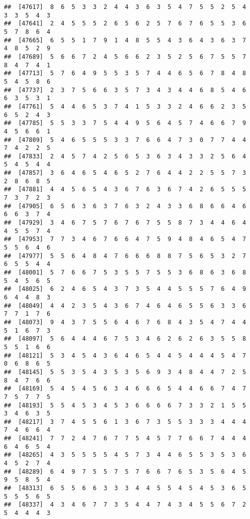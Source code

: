 \documentclass[
]{book}
\begin{document}
\begin{verbatim}
##  [47617]  8  6  5  3  3  2  4  4  3  6  3  5  4  7  5  5  2  5  4  3  3  5  4  3
##  [47641]  2  4  5  5  5  2  6  5  6  2  5  7  6  7  6  5  5  3  6  5  7  8  6  4
##  [47665]  6  5  5  1  7  9  1  4  8  5  5  4  3  6  4  3  6  3  7  4  8  5  2  9
##  [47689]  5  6  6  7  2  4  5  6  6  2  3  5  2  5  6  7  5  5  7  8  4  7  4  1
##  [47713]  5  7  6  4  9  5  5  3  5  7  4  4  6  5  6  7  8  4  8  5  4  5  8  6
##  [47737]  2  3  7  5  6  6  3  5  7  3  4  3  4  4  6  8  5  4  6  6  3  5  3  1
##  [47761]  5  4  4  6  5  3  7  4  1  5  3  3  2  4  6  6  2  3  5  6  5  2  4  3
##  [47785]  5  5  3  3  7  5  4  4  9  5  6  4  5  7  4  6  6  7  9  4  5  6  6  1
##  [47809]  5  4  6  5  5  5  3  3  7  6  6  4  7  3  0  7  7  4  4  7  4  2  2  5
##  [47833]  2  4  5  7  4  2  5  6  5  3  6  3  4  3  3  2  5  6  4  5  4  5  4  4
##  [47857]  3  6  4  6  5  4  6  5  2  7  6  4  4  2  2  5  5  7  3  2  8  6  8  5
##  [47881]  4  4  5  6  5  4  3  6  7  6  3  6  7  4  2  6  5  5  5  7  3  7  2  3
##  [47905]  6  5  6  3  6  3  7  6  3  2  4  3  3  6  8  6  6  4  6  6  6  3  7  4
##  [47929]  3  4  6  7  5  7  6  7  6  7  5  5  8  7  3  4  4  6  4  4  5  5  7  4
##  [47953]  7  7  3  4  6  7  6  6  4  7  5  9  4  8  4  6  5  4  7  5  5  6  4  6
##  [47977]  5  5  6  4  8  4  7  6  6  6  8  8  7  5  6  5  3  2  7  6  5  5  4  4
##  [48001]  5  7  6  6  7  5  3  5  5  7  5  5  3  6  8  6  3  6  8  5  4  5  6  5
##  [48025]  6  2  4  6  5  4  3  7  3  5  4  4  5  5  5  7  6  4  9  6  4  4  8  3
##  [48049]  4  4  2  3  5  4  3  6  7  4  6  4  6  5  5  6  3  3  6  7  7  1  7  6
##  [48073]  9  4  3  7  5  5  6  4  6  7  6  8  4  3  5  4  7  4  4  5  1  6  7  3
##  [48097]  5  6  4  4  4  6  7  5  3  4  6  2  6  2  6  3  5  5  8  5  5  1  6  6
##  [48121]  5  3  4  5  4  3  6  4  6  5  4  4  5  4  4  4  5  4  7  0  6  8  6  5
##  [48145]  5  5  3  5  4  3  5  3  5  6  9  3  4  8  4  4  7  2  5  8  4  7  6  6
##  [48169]  5  4  5  4  5  6  3  4  6  6  6  5  4  4  6  6  7  4  7  7  5  7  7  5
##  [48193]  5  5  4  5  3  4  5  3  6  6  6  6  7  3  3  2  1  5  5  3  4  6  3  5
##  [48217]  3  7  4  5  5  6  1  3  6  7  3  5  5  3  3  3  4  4  4  7  4  6  6  4
##  [48241]  7  7  2  4  7  6  7  7  5  4  5  7  7  6  6  7  4  4  4  6  4  6  5  4
##  [48265]  4  3  5  5  5  5  4  5  7  3  4  4  6  5  5  3  5  3  6  4  5  2  7  4
##  [48289]  6  4  9  7  5  5  7  5  7  6  6  7  6  5  3  5  6  4  5  9  5  8  5  4
##  [48313]  6  5  5  6  6  3  3  3  4  4  5  5  4  5  4  5  3  6  5  5  5  5  6  5
##  [48337]  4  3  4  6  7  7  3  5  4  4  7  4  3  4  5  5  6  7  2  5  4  4  4  3

\end{verbatim}
\end{document}
